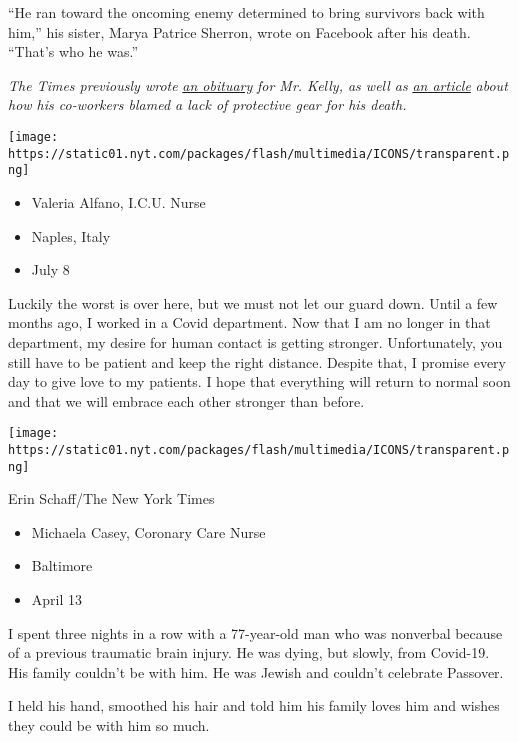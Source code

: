 ``He ran toward the oncoming enemy determined to bring survivors back
with him,'' his sister, Marya Patrice Sherron, wrote on Facebook after
his death. ``That's who he was.''

\emph{The Times previously wrote}
\emph{\href{https://www.nytimes.com/2020/03/31/obituaries/kious-kelly-dead-coronavirus.html}{an
obituary}} \emph{for Mr. Kelly, as well as}
\emph{\href{https://www.nytimes.com/2020/03/26/nyregion/nurse-dies-coronavirus-mount-sinai.html}{an
article}} \emph{about how his co-workers blamed a lack of protective
gear for his death.}

\texttt{[image: https://static01.nyt.com/packages/flash/multimedia/ICONS/transparent.png]}

\begin{itemize}
\tightlist
\item
  Valeria Alfano, I.C.U. Nurse
\item
  Naples, Italy
\item
  July 8
\end{itemize}

Luckily the worst is over here, but we must not let our guard down.
Until a few months ago, I worked in a Covid department. Now that I am no
longer in that department, my desire for human contact is getting
stronger. Unfortunately, you still have to be patient and keep the right
distance. Despite that, I promise every day to give love to my patients.
I hope that everything will return to normal soon and that we will
embrace each other stronger than before.

\texttt{[image: https://static01.nyt.com/packages/flash/multimedia/ICONS/transparent.png]}

Erin Schaff/The New York Times

\begin{itemize}
\tightlist
\item
  Michaela Casey, Coronary Care Nurse
\item
  Baltimore
\item
  April 13
\end{itemize}

I spent three nights in a row with a 77-year-old man who was nonverbal
because of a previous traumatic brain injury. He was dying, but slowly,
from Covid-19. His family couldn't be with him. He was Jewish and
couldn't celebrate Passover.

I held his hand, smoothed his hair and told him his family loves him and
wishes they could be with him so much.


